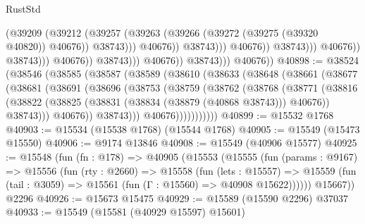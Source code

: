 \begin{lexlean}{RustStd}
\begin{coremodule}
                                                        (@39209
                                                          (@39212
                                                            (@39257
                                                              (@39263
                                                                (@39266
                                                                  (@39272
                                                                    (@39275 (@39320 @40820))
                                                                    @40676))
                                                                @38743)))
                                                          @40676))
                                                      @38743)))
                                                @40676))
                                            @38743)))
                                      @40676))
                                  @38743)))
                            @40676))
                        @38743)))
                  @40676))
              @38743)))
        @40676))
@40898 := @38524
    (@38546
      (@38585
        (@38587
          (@38589
            (@38610
              (@38633
                (@38648
                  (@38661
                    (@38677
                      (@38681
                        (@38691
                          (@38696
                            (@38753
                              (@38759
                                (@38762
                                  (@38768
                                    (@38771
                                      (@38816
                                        (@38822
                                          (@38825 (@38831 (@38834 (@38879 (@40868 @38743))) @40676))
                                          @38743)))
                                    @40676))
                                @38743)))
                          @40676)))))))))))
@40899 := @15532 @1768
@40903 := @15534 (@15538 @1768) (@15544 @1768)
@40905 := @15549 (@15473 @15550)
@40906 := @9174 @13846
@40908 := @15549 (@40906 @15577)
@40925 := @15548
    (fun (fn : @178) =>
    @40905
      (@15553
        (@15555
          (fun (params : @9167) =>
          @15556
            (fun (rty : @2660) =>
            @15558
              (fun (lets : @15557) =>
              @15559 (fun (tail : @3059) => @15561 (fun (Γ : @15560) => @40908 @15622))))))
        @15667))
    @2296
@40926 := @15673 @15475
@40929 := @15589 (@15590 @2296) @37037
@40933 := @15549 (@15581 (@40929 @15597) @15601)

\end{coremodule}
\end{lexlean}
